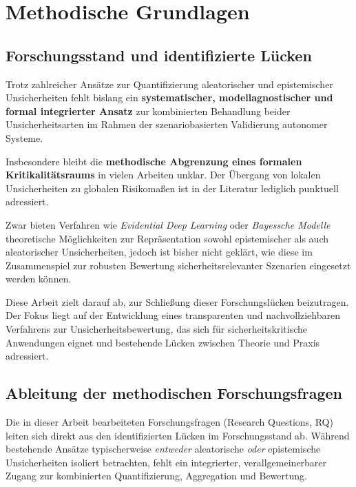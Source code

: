 
\chapter{Methodische Grundlagen}\label{chapter:methodik}

\section{Forschungsstand und identifizierte Lücken}

Trotz zahlreicher Ansätze zur Quantifizierung aleatorischer und epistemischer Unsicherheiten fehlt bislang ein \textbf{systematischer, modellagnostischer und formal integrierter Ansatz} zur kombinierten Behandlung beider Unsicherheitsarten im Rahmen der szenariobasierten Validierung autonomer Systeme.

Insbesondere bleibt die \textbf{methodische Abgrenzung eines formalen Kritikalitätsraums} in vielen Arbeiten unklar. Der Übergang von lokalen Unsicherheiten zu globalen Risikomaßen ist in der Literatur lediglich punktuell adressiert.

Zwar bieten Verfahren wie \textit{Evidential Deep Learning} oder \textit{Bayessche Modelle} theoretische Möglichkeiten zur Repräsentation sowohl epistemischer als auch aleatorischer Unsicherheiten, jedoch ist bisher nicht geklärt, wie diese im Zusammenspiel zur robusten Bewertung sicherheitsrelevanter Szenarien eingesetzt werden können.

Diese Arbeit zielt darauf ab, zur Schließung dieser Forschungslücken beizutragen. Der Fokus liegt auf der Entwicklung eines transparenten und nachvollziehbaren Verfahrens zur Unsicherheitsbewertung, das sich für sicherheitskritische Anwendungen eignet und bestehende Lücken zwischen Theorie und Praxis adressiert.

\section{Ableitung der methodischen Forschungsfragen}

Die in dieser Arbeit bearbeiteten Forschungsfragen (Research Questions, RQ) leiten sich direkt aus den identifizierten Lücken im Forschungsstand ab. Während bestehende Ansätze typischerweise \emph{entweder} aleatorische \emph{oder} epistemische Unsicherheiten isoliert betrachten, fehlt ein integrierter, verallgemeinerbarer Zugang zur kombinierten Quantifizierung, Aggregation und Bewertung.

